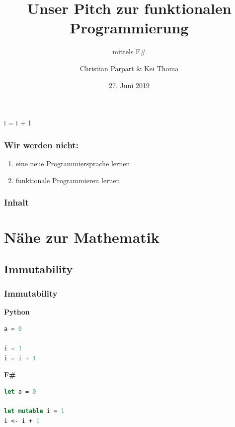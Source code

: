 \documentclass{beamer}
\title[F\#]{Unser Pitch zur funktionalen Programmierung
}
\subtitle{mittels F\#}
\author[Parpart \& Thoma]{Christian Parpart \& Kei Thoma}
\institute[HU]{Humboldt Universität zu Berlin}
\date{27. Juni 2019}
\begin{document}
\frame{\titlepage}

\begin{frame}
    \begin{center}
        {\Huge i = i + 1}
    \end{center}
\end{frame}

\begin{frame}
    \frametitle{Wir werden nicht:}
    \begin{enumerate}
        \item eine neue Programmiersprache lernen
        \item funktionale Programmieren lernen
    \end{enumerate}
\end{frame}

\frame{\titlepage}

\begin{frame}
    \frametitle{Inhalt}
    \tableofcontents
\end{frame}

\section{Nähe zur Mathematik}

\subsection{Immutability}

\begin{frame}[fragile]
    \frametitle{Immutability}
    \begin{minipage}[t]{0.5\linewidth}
        \begin{center}
            \textbf{Python}
        \end{center}
        \begin{lstlisting}[language=Python,numbersep=0pt,resetmargins=true]
a = 0

i = 1
i = i + 1
        \end{lstlisting}
        \end{minipage}%
        \begin{minipage}[t]{0.5\linewidth}
        \begin{center}
            \textbf{F\#}
        \end{center}
        \begin{lstlisting}[language=FSharp]
let a = 0

let mutable i = 1
i <- i + 1
        \end{lstlisting}
        \end{minipage}%
\end{frame}
\end{document}

